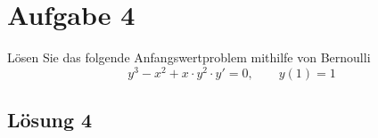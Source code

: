 \documentclass[main.tex]{subfiles}
\begin{document}
\section{Aufgabe 4}
Lösen Sie das folgende Anfangswertproblem mithilfe von Bernoulli
\[
    y^3 - x^2 + x \cdot y^2 \cdot y' = 0, \qquad y(1) = 1
\]

\subsection{Lösung 4}
\end{document}
